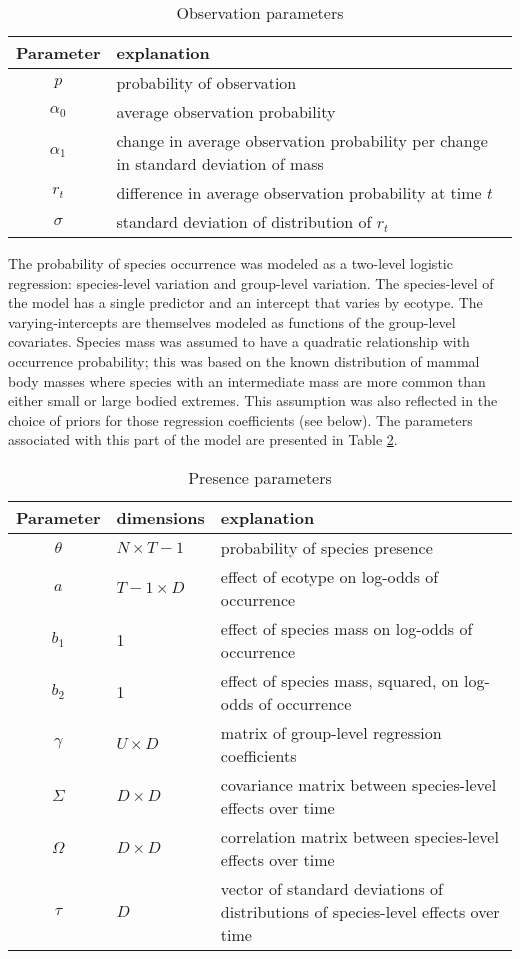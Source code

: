 \documentclass[12pt,letterpaper]{article}
\begin{document}
\begin{table}
  \centering
  \begin{tabular}{c l}
    Parameter & explanation \\
    \hline
    \(p\) & probability of observation \\
    \(\alpha_{0}\) & average observation probability \\
    \(\alpha_{1}\) & change in average observation probability per change in standard deviation of mass \\
    \(r_{t}\) & difference in average observation probability at time \(t\) \\
    \(\sigma\) & standard deviation of distribution of \(r_{t}\) \\
  \end{tabular}
  \caption{Observation parameters}
  \label{tab:obs_param}
\end{table}


The probability of species occurrence was modeled as a two-level logistic regression: species-level variation and group-level variation. The species-level of the model has a single predictor and an intercept that varies by ecotype. The varying-intercepts are themselves modeled as functions of the group-level covariates. Species mass was assumed to have a quadratic relationship with occurrence probability; this was based on the known distribution of mammal body masses where species with an intermediate mass are more common than either small or large bodied extremes. This assumption was also reflected in the choice of priors for those regression coefficients (see below). The parameters associated with this part of the model are presented in Table \ref{tab:pres_param}. 

\begin{table}
  \centering
  \begin{tabular}{c l l}
    Parameter & dimensions & explanation \\
    \hline
    \(\theta\) & \(N \times T - 1\) & probability of species presence \\
    \(a\) & \(T - 1 \times D\) & effect of ecotype on log-odds of occurrence \\
    \(b_{1}\) & 1 & effect of species mass on log-odds of occurrence \\
    \(b_{2}\) & 1 & effect of species mass, squared, on log-odds of occurrence \\
    \(\gamma\) & \(U \times D\) & matrix of group-level regression coefficients \\
    \(\Sigma\) & \(D \times D\) & covariance matrix between species-level effects over time \\
    \(\Omega\) & \(D \times D\) & correlation matrix between species-level effects over time \\
    \(\tau\) & \(D\) & vector of standard deviations of distributions of species-level effects over time\\
  \end{tabular}
  \caption{Presence parameters}
  \label{tab:pres_param}
\end{table}
\end{document}
